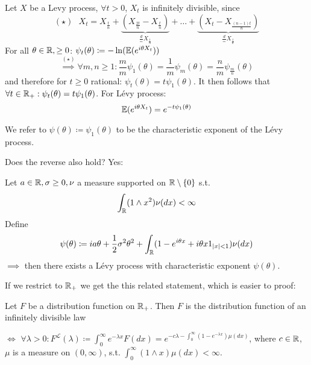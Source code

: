 Let $X$ be a Levy process, $\forall t>0$, $X_t$ is infinitely divisible, since 
\[(\star) \text{ }X_t=X_{\frac{t}{n}}+\underbrace{\left(X_\frac{2t}{n}-X_\frac{t}{n}\right)}_{\frac{d}{=}X_\frac{t}{n}}+\dots+\underbrace{\left(X_t-X_\frac{(n-1)t}{n}\right)}_{\frac{d}{=}X_\frac{t}{n}}\]
For all $\theta\in\mathbb{R},\geq 0$: $\psi_t(\theta)\coloneqq -\ln(\mathbb{E}(e^{i\theta X_t}))$
\[\stackrel{(\star)}{\implies}\forall m,n\geq 1: \frac{m}{m}\psi_1(\theta)=\frac{1}{m}\psi_m(\theta)=\frac{n}{m}\psi_{\frac{m}{n}}(\theta)\]
and therefore for $t\geq 0$ rational: $\psi_t(\theta)=t\psi_1(\theta)$.
It then follows that $\forall t\in\mathbb{R}_+: \psi_t(\theta)=t\psi_1(\theta)$.
For Lévy process:
\[\mathbb{E}(e^{i\theta X_t})=e^{-t\psi_1(\theta)}\]
\begin{definition}\label{def:4.3}
    We refer to $\psi(\theta)\coloneqq \psi_1(\theta)$ to be the characteristic exponent of the Lévy process.
\end{definition}

Does the reverse also hold? Yes:

\begin{theorem}\label{thm:4.4}
    Let $a\in\mathbb{R},\sigma\geq 0,\nu$ a measure supported on $\mathbb{R}\setminus\{0\}$ s.t. \[\int_{\mathbb{R}} (1\land x^2)\nu(dx)<\infty\]
    Define \[\psi(\theta)\coloneqq ia\theta+\frac{1}{2}\sigma^2\theta^2+\int_{\mathbb{R}} (1-e^{i\theta x}+i\theta x1_{|x|<1})\nu(dx)\]
    $\implies$ then there exists a Lévy process with characteristic exponent $\psi(\theta)$.
\end{theorem}

If we restrict to $\mathbb{R}_+$ we get the this related statement, which is easier to proof:

\begin{proposition}\label{Prop:4.5}
    Let $F$ be a distribution function on $\mathbb{R}_+$. Then $F$ is the distribution function of an infinitely 
    divisible law
    
    $\iff$ $\forall\lambda >0: F^\mathcal{L}(\lambda)\coloneqq \int_0^\infty e^{-\lambda x}F(dx)=e^{-c\lambda-\int_0^\infty (1-e^{-\lambda x})\mu(dx)}$,
    where $c\in\mathbb{R}$, $\mu$ is a measure on $(0,\infty)$, s.t. $\int_0^\infty (1\land x)\mu(dx)<\infty$. 
\end{proposition}


